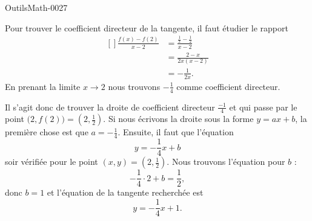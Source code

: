 
\begin{corrige}{OutilsMath-0027}

	Pour trouver le coefficient directeur de la tangente, il faut étudier le rapport
	\begin{equation}
		\begin{aligned}[]
			\frac{ f(x)-f(2) }{ x-2 }&=\frac{ \frac{1}{ x }-\frac{1}{ 2 } }{ x-2 }\\
			&=\frac{ 2-x }{ 2x(x-2) }\\
			&=-\frac{1}{ 2x }.
		\end{aligned}
	\end{equation}
	En prenant la limite $x\to 2$ nous trouvons $-\frac{1}{ 4 }$ comme coefficient directeur.

	Il s'agit donc de trouver la droite de coefficient directeur $\frac{-1}{ 4 }$ et qui passe par le point $\big( 2,f(2) \big)=(2,\frac{1}{ 2 })$. Si nous écrivons la droite sous la forme $y=ax+b$, la première chose est que $a=-\frac{1}{ 4 }$. Ensuite, il faut que l'équation
	\begin{equation}
		y=-\frac{1}{ 4 }x+b
	\end{equation}
	soir vérifiée pour le point $(x,y)=(2,\frac{1}{ 2 })$. Nous trouvons l'équation pour $b$ :
	\begin{equation}
		-\frac{ 1 }{4}\cdot 2+b=\frac{ 1 }{2},
	\end{equation}
	donc $b=1$ et l'équation de la tangente recherchée est
	\begin{equation}
		y=-\frac{1}{ 4 }x+1.
	\end{equation}

\end{corrige}
